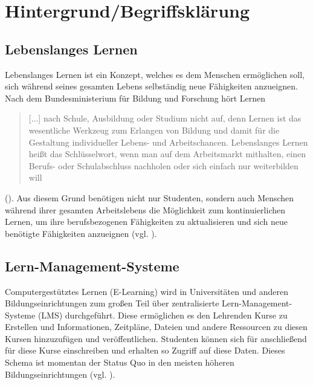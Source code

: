 \chapter{Hintergrund/Begriffsklärung} 
\label{chapter:Kapitel2}

\section{Lebenslanges Lernen}
Lebenslanges Lernen ist ein Konzept, welches es dem Menschen ermöglichen soll, sich während seines gesamten Lebens selbständig neue Fähigkeiten anzueignen. Nach dem Bundesministerium für Bildung und Forschung hört Lernen \begin{quotation}
 [...] nach Schule, Ausbildung oder Studium nicht auf, denn Lernen ist das wesentliche Werkzeug zum Erlangen von Bildung und damit für die Gestaltung individueller Lebens- und Arbeitschancen. Lebenslanges Lernen heißt das Schlüsselwort, wenn man auf dem Arbeitsmarkt mithalten, einen Berufs- oder Schulabschluss nachholen oder sich einfach nur weiterbilden will 
\end{quotation} (\cite{BMBF2008}).
Aus diesem Grund benötigen nicht nur Studenten, sondern auch Menschen während ihrer gesamten Arbeitslebens die Möglichkeit zum kontinuierlichen Lernen, um ihre berufsbezogenen Fähigkeiten zu aktualisieren und sich neue benötigte Fähigkeiten anzueignen (vgl. \cite{Attwell2007}).

\section{Lern-Management-Systeme}\label{section:lms}
Computergestütztes Lernen (E-Learning) wird in Universitäten und anderen Bildungseinrichtungen zum großen Teil über zentralisierte Lern-Management-Systeme (LMS) durchgeführt. Diese ermöglichen es den Lehrenden Kurse zu Erstellen und Informationen, Zeitpläne, Dateien und andere Ressourcen zu diesen Kursen hinzuzufügen und veröffentlichen. Studenten können sich für anschließend für diese Kurse einschreiben und erhalten so Zugriff auf diese Daten. Dieses Schema ist momentan der Status Quo in den meisten höheren Bildungseinrichtungen (vgl. \cite{Mott2010}). 


